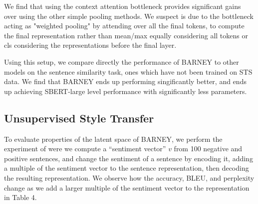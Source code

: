 


We find that using the context attention bottleneck provides significant gains over using the other simple pooling methods. We suspect is due to the bottleneck acting as "weighted pooling" by attending over all the final tokens, to compute the final representation rather than mean/max equally considering all tokens or cls considering the representations before the final layer.



Using this setup, we compare directly the performance of BARNEY to other models on the sentence similarity task, ones which have not been trained on STS data. We find that BARNEY ends up performing singificantly better, and ends up achieving SBERT-large level performance with significantly less parameters.




\subsection{Unsupervised Style Transfer}
To evaluate properties of the latent space of BARNEY, we perform the experiment of \citet{shen2019educating} were we compute a “sentiment vector” $v$ from 100 negative and positive sentences, and change the sentiment of a sentence by encoding it, adding a multiple of the sentiment vector to the sentence representation, then decoding the resulting representation. We observe how the accuracy, BLEU, and perplexity change as we add a larger multiple of the sentiment vector to the representation in Table 4.



